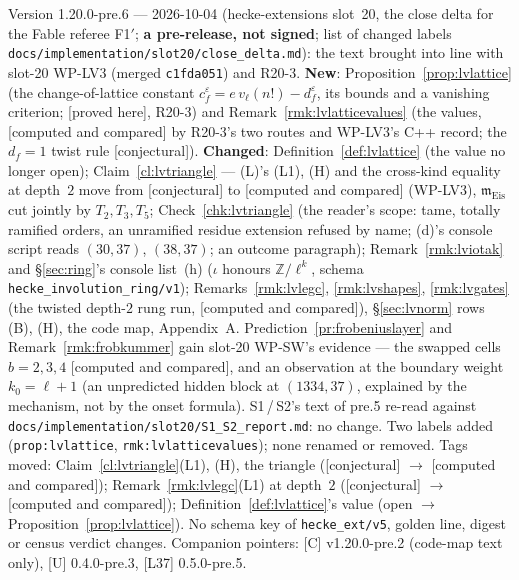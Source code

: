 \documentclass[11pt]{article}
\theoremstyle{remark}
\newcommand{\Z}{\mathbb{Z}}
\newcommand{\m}{\mathfrak{m}}
\newcommand{\PROVED}{\textsf{[proved here]}}
\newcommand{\CONJ}{\textsf{[conjectural]}}
\newcommand{\CMPD}{\textsf{[computed and compared]}}   %
\begin{document}
Version 1.20.0-pre.6 --- 2026-10-04 (hecke-extensions slot~20, the close delta for the Fable referee F1$'$; \textbf{a pre-release, not signed}; list of changed labels
\texttt{docs/implementation/slot20/close\_delta.md}): the text brought into line with slot-20 WP-LV3 (merged \texttt{c1fda051}) and R20-3. \textbf{New}: Proposition~\ref{prop:lvlattice} (the
change-of-lattice constant $c_f^{\varepsilon}=e\,v_\ell(n!)-d_f^{\varepsilon}$, its bounds and a vanishing criterion; \PROVED, R20-3) and Remark~\ref{rmk:lvlatticevalues} (the values, \CMPD{} by
R20-3's two routes and WP-LV3's C++ record; the $d_f=1$ twist rule \CONJ). \textbf{Changed}: Definition~\ref{def:lvlattice} (the value no longer open); Claim~\ref{cl:lvtriangle} --- (L)'s (L1),
(H) and the cross-kind equality at depth~$2$ move from \CONJ{} to \CMPD{} (WP-LV3), $\m_{\mathrm{Eis}}$ cut jointly by $T_2,T_3,T_5$; Check~\ref{chk:lvtriangle} (the reader's scope: tame, totally
ramified orders, an unramified residue extension refused by name; (d)'s console script reads $(30,37)$, $(38,37)$; an outcome paragraph); Remark~\ref{rmk:lviotak} and \S\ref{sec:ring}'s
console list~(h) ($\iota$ honours $\Z/\ell^{k}$, schema \texttt{hecke\_involution\_ring/v1}); Remarks~\ref{rmk:lvlegc}, \ref{rmk:lvshapes}, \ref{rmk:lvgates} (the twisted depth-$2$ rung run, \CMPD),
\S\ref{sec:lvnorm} rows (B), (H), the code map, Appendix~A. Prediction~\ref{pr:frobeniuslayer} and Remark~\ref{rmk:frobkummer} gain slot-20 WP-SW's evidence --- the swapped cells $b=2,3,4$ \CMPD, and an observation at the boundary weight $k_0=\ell+1$
(an unpredicted hidden block at $(1334,37)$, explained by the mechanism, not by the onset formula). S1\,/\,S2's text of pre.5 re-read against \texttt{docs/implementation/slot20/S1\_S2\_report.md}: no change. Two labels added
(\texttt{prop:lvlattice}, \texttt{rmk:lvlatticevalues}); none renamed or removed. Tags moved: Claim~\ref{cl:lvtriangle}(L1), (H), the triangle (\CONJ{} $\to$ \CMPD); Remark~\ref{rmk:lvlegc}(L1) at
depth~$2$ (\CONJ{} $\to$ \CMPD); Definition~\ref{def:lvlattice}'s value (open $\to$ Proposition~\ref{prop:lvlattice}). No schema key of \texttt{hecke\_ext/v5}, golden line, digest or census verdict
changes. Companion pointers: [C] v1.20.0-pre.2 (code-map text only), [U] 0.4.0-pre.3, [L37] 0.5.0-pre.5.
\end{document}
